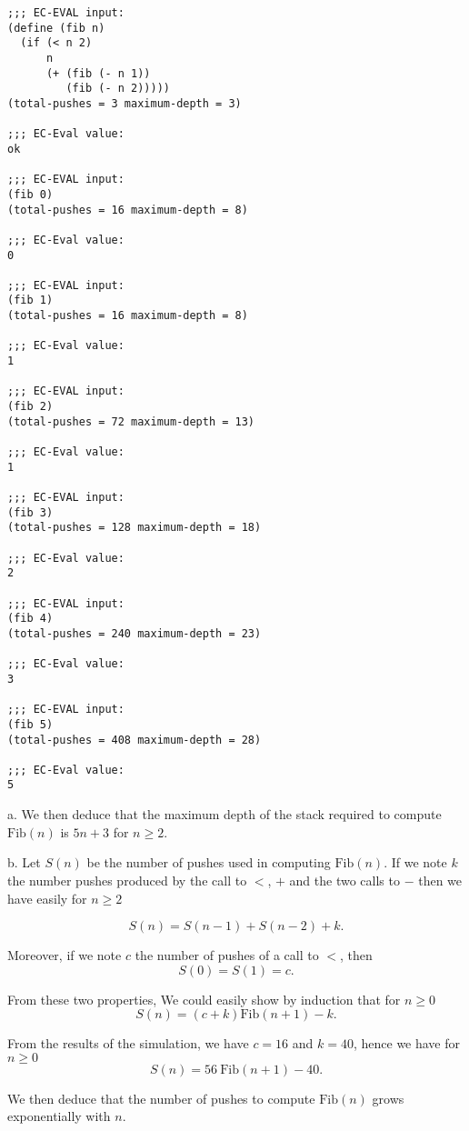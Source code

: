 \documentclass[a4paper,12pt]{article}
\newcommand{\subpar}[1]{\medskip \noindent #1.}
\begin{document}
\begin{lstlisting}
;;; EC-EVAL input:
(define (fib n)
  (if (< n 2)
      n
      (+ (fib (- n 1))
         (fib (- n 2)))))
(total-pushes = 3 maximum-depth = 3)

;;; EC-Eval value:
ok

;;; EC-EVAL input:
(fib 0)
(total-pushes = 16 maximum-depth = 8)

;;; EC-Eval value:
0

;;; EC-EVAL input:
(fib 1)
(total-pushes = 16 maximum-depth = 8)

;;; EC-Eval value:
1

;;; EC-EVAL input:
(fib 2)
(total-pushes = 72 maximum-depth = 13)

;;; EC-Eval value:
1

;;; EC-EVAL input:
(fib 3)
(total-pushes = 128 maximum-depth = 18)

;;; EC-Eval value:
2

;;; EC-EVAL input:
(fib 4)
(total-pushes = 240 maximum-depth = 23)

;;; EC-Eval value:
3

;;; EC-EVAL input:
(fib 5)
(total-pushes = 408 maximum-depth = 28)

;;; EC-Eval value:
5
\end{lstlisting}

\subpar{a} We then deduce that the maximum depth of the stack required
to compute $\mathrm{Fib}(n)$ is $5 n + 3$ for $n \ge 2$.

\subpar{b} Let $S(n)$ be the number of pushes used in computing
$\mathrm{Fib}(n)$.  If we note $k$ the number pushes
produced by the call to $<$, $+$ and the two calls to $-$ then we have
easily for $n \ge 2$

\[ S(n) = S(n-1) + S(n-2) + k.\]

Moreover, if we note $c$ the number of pushes of a call to $<$, then
\[ S(0) = S(1) = c.\]

From these two properties, We could easily show by induction that for
$n \ge 0$
\[ S(n) = (c+k) \mathrm{Fib}(n+1) - k.\]

From the results of the simulation, we have $c = 16$ and  $k = 40$,
hence we have for $n \ge 0$
\[ S(n) = 56\ \mathrm{Fib}(n+1) - 40.\]

We then deduce that the number of pushes to compute $\mathrm{Fib}(n)$
grows exponentially with $n$.
\end{document}
